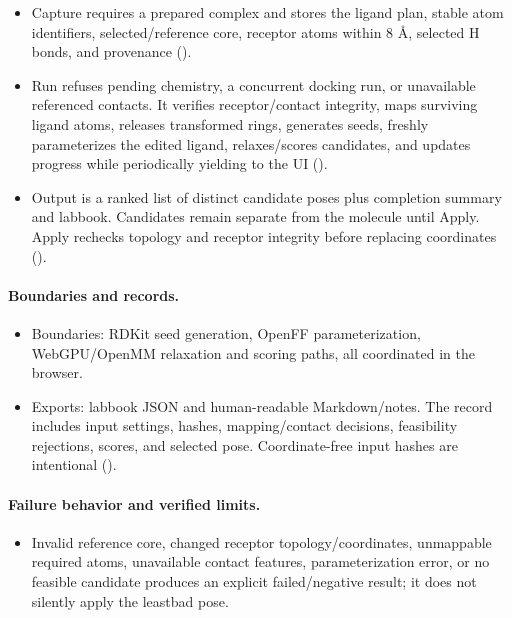 \documentclass[11pt]{article}
\begin{document}
\begin{small}
\begin{itemize}[leftmargin=*]
\item Capture requires a prepared complex and stores the ligand plan, stable atom identifiers, selected/reference core, receptor atoms within 8 \AA{}, selected H bonds, and provenance ().

\item Run refuses pending chemistry, a concurrent docking run, or unavailable referenced contacts. It verifies receptor/contact integrity, maps surviving ligand atoms, releases transformed rings, generates seeds, freshly parameterizes the edited ligand, relaxes/scores candidates, and updates progress while periodically yielding to the UI ().

\item Output is a ranked list of distinct candidate poses plus completion summary and labbook. Candidates remain separate from the molecule until Apply. Apply rechecks topology and receptor integrity before replacing coordinates ().

\end{itemize}

\paragraph{Boundaries and records.}

\begin{itemize}[leftmargin=*]

\item Boundaries: RDKit seed generation, OpenFF parameterization, WebGPU/OpenMM relaxation and scoring paths, all coordinated in the browser.

\item Exports: labbook JSON and human-readable Markdown/notes. The record includes input settings, hashes, mapping/contact decisions, feasibility rejections, scores, and selected pose. Coordinate-free input hashes are intentional ().

\end{itemize}

\paragraph{Failure behavior and verified limits.}

\begin{itemize}[leftmargin=*]

\item Invalid reference core, changed receptor topology/coordinates, unmappable required atoms, unavailable contact features, parameterization error, or no feasible candidate produces an explicit failed/negative result; it does not silently apply the leastbad pose.


\end{itemize}
\end{small}
\end{document}
